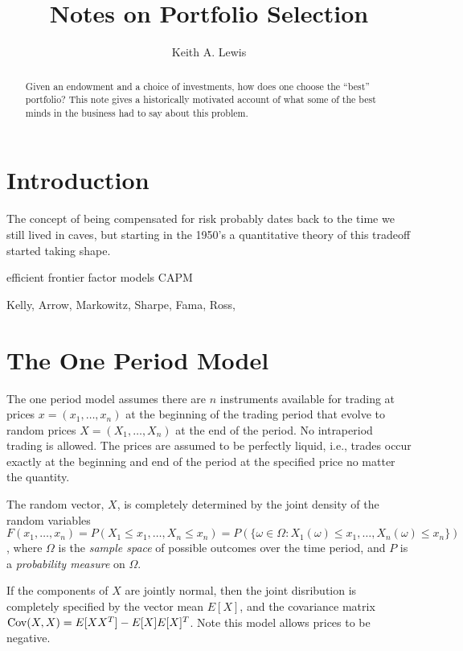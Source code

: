 \documentclass[11pt,fleqn]{amsart}
\newcommand{\Cov}{\mathop{\rm{Cov}}}
\begin{document}
\title{Notes on Portfolio Selection}
\author{Keith A. Lewis}
\address{KALX, LLC}
\begin{abstract}
Given an endowment and a choice of investments, how does one
choose the ``best'' portfolio? This note gives a historically
motivated account of what some of the best minds in the business
had to say about this problem.
\end{abstract}

\maketitle

\section{Introduction}
The concept of being compensated for risk probably dates back to the
time we still lived in caves, but starting in the 1950's a quantitative
theory of this tradeoff started taking shape.

efficient frontier
factor models
CAPM

Kelly,
Arrow,
Markowitz,
Sharpe,
Fama,
Ross,

\section{The One Period Model}
The one period model assumes there are $n$ instruments available for
trading at prices $x = (x_1,\dots,x_n)$ at the beginning of the trading
period that evolve to random prices $X = (X_1,\dots,X_n)$ at the end of
the period.  No intraperiod trading is allowed. The prices are assumed
to be perfectly liquid, i.e., trades occur exactly at the beginning and
end of the period at the specified price no matter the quantity.

The random vector, $X$, is completely determined by the joint density
of the random variables $F(x_1,\dots, x_n) = P(X_1 \le x_1, \dots, X_n \le
x_n) = P(\{\omega\in\Omega\colon X_1(\omega) \le x_1, \dots, X_n(\omega)
\le x_n\})$, where $\Omega$ is the {\em sample space} of possible outcomes
over the time period, and $P$ is a {\em probability measure} on $\Omega$.

If the components of $X$ are jointly normal, then the joint disribution
is completely specified by the vector mean $E[X]$, and the covariance
matrix $\Cov(X,X) = E[XX^T] - E[X]E[X]^T$. Note this model allows prices
to be negative.
\end{document}
